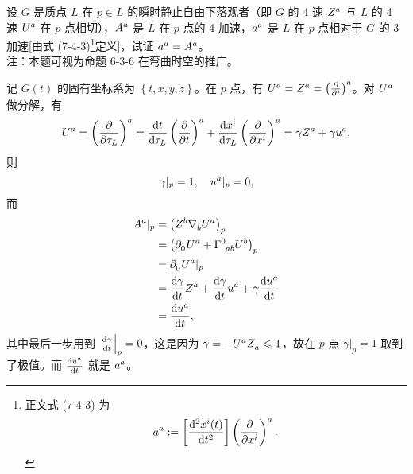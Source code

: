\begin{xiti}
	\item 设 $G$ 是质点 $L$ 在 $p\in L$ 的瞬时静止自由下落观者（即 $G$ 的 4 速 $\tensor{Z}{^a}$ 与 $L$ 的 4 速 $\tensor{U}{^a}$ 在 $p$ 点相切），$\tensor{A}{^a}	$ 是 $L$ 在 $p$ 点的 4 加速，$\tensor{a}{^a}	$ 是 $L$ 在 $p$ 点相对于 $G$ 的 3 加速[由式 (7-4-3)\footnote{正文式 (7-4-3) 为
	\begin{equation*}
		\tensor{a}{^a} := \left[ \dv[2]{x^i(t)}{t} \right] \tensor{\left( \pdv{x^i} \right)}{^a}.
	\end{equation*}}定义]，试证 $\tensor{a}{^a} = \tensor{A}{^a}$。\\
	注：本题可视为命题 6-3-6 在弯曲时空的推广。

		\begin{zm}
			记 $G(t)$ 的固有坐标系为 $\left\{ t,x,y,z \right\}$。在 $p$ 点，有 $\tensor{U}{^a} = \tensor{Z}{^a} = \tensor{\left( \pdv{t} \right)}{^a}$。对 $\tensor{U}{^a}$ 做分解，有
			\begin{equation*}
				\tensor{U}{^a} = \tensor{\left( \pdv{\tau_L} \right)}{^a} = \dv{t}{\tau_L} \tensor{\left( \pdv{t} \right)}{^a} + \dv{x^i}{\tau_L} \tensor{\left( \pdv{x^i} \right)}{^a} = \gamma \tensor{Z}{^a} + \gamma \tensor{u}{^a},
			\end{equation*}
			则
			\begin{equation*}
				\gamma|_p = 1 \qc \tensor{u}{^a}|_{p} = 0,
			\end{equation*}
			而
			\begin{equation*}
				\begin{split}
					\tensor{A}{^a}|_p &= \left( \tensor{Z}{^b} \Nabla{b} \tensor{U}{^a} \right)_p\\
					&= \left( \Partial{0} \tensor{U}{^a} + \ChristoffelSymbol{0}{a}{b} \tensor{U}{^b} \right)_p\\
					&= \Partial{0} \tensor{U}{^a} |_p\\
					&= \dv{\gamma}{t} \tensor{Z}{^a} + \dv{\gamma}{t} \tensor{u}{^a} + \gamma \dv{\tensor{u}{^a}}{t}\\
					&= \dv{\tensor{u}{^a}}{t},
				\end{split}
			\end{equation*}
			其中最后一步用到 $\left.\dv{\gamma}{t}\right|_p = 0$，这是因为 $\gamma = - \tensor{U}{^a} \tensor{Z}{_a} \leqslant 1$，故在 $p$ 点 $\gamma|_p=1$ 取到了极值。而 $\dv{\tensor{u}{^a}}{t}$ 就是 $\tensor{a}{^a}$。
		\end{zm}
    
\end{xiti}